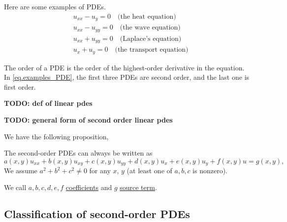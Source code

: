 \begin{example}
    Here are some examples of PDEs.
    \begin{equation}\label{eq.examples_PDE}
        \begin{split}
            &u_{x x}-u_y=0 \quad \text{(the heat equation)}
            \\
            &u_{x x}-u_{y y}=0 \quad \text{(the wave equation)}
            \\
            &u_{x x}+u_{y y}=0 \quad \text{(Laplace's equation)}
            \\
            &u_{x}+u_{y}=0 \quad \text{(the transport equation)}
        \end{split}
    \end{equation}
\end{example}

\begin{definition}
    The order of a PDE is the order of the highest-order derivative in the equation.
    In \eqref{eq.examples_PDE}, the first three PDEs are second order, and the last one is first order.
\end{definition}

\begin{definition}
    \textbf{TODO: def of linear pdes}
\end{definition}

\begin{proposition}[]
    \textbf{TODO: general form of second order linear pdes}
\end{proposition}

We have the following proposition,

\begin{proposition}[]
The second-order PDEs can always be written as
\begin{equation}\label{eq.2nd_order_linear}
    a(x, y) u_{x x}+b(x, y) u_{x y}+c(x, y) u_{y y}+d(x, y) u_x+e(x, y) u_y+f(x, y) u=g(x, y),
\end{equation}
We assume $a^2+b^2+c^2 \neq 0$ for any $x$, $y$ (at least one of $a, b, c$ is nonzero). 
\end{proposition}

\begin{definition}[]
    We call $a, b, c, d, e, f$ \underline{coefficients} and $g$ \underline{source term}. 
\end{definition}

\subsection{Classification of second-order PDEs}


